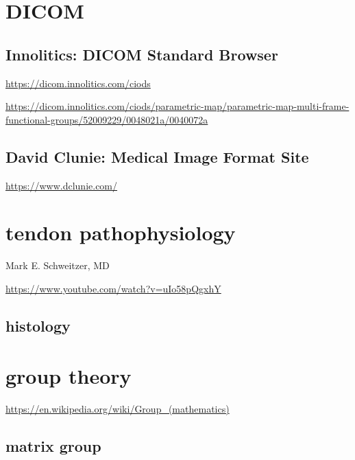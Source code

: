 \documentclass[
]{book}
\theoremstyle{definition}
\theoremstyle{definition}
\theoremstyle{definition}
\theoremstyle{definition}
\theoremstyle{remark}
\begin{document}
\hypertarget{dicom}{%
\chapter{DICOM}\label{dicom}}

\hypertarget{innolitics-dicom-standard-browser}{%
\section{Innolitics: DICOM Standard Browser}\label{innolitics-dicom-standard-browser}}

\url{https://dicom.innolitics.com/ciods}

\url{https://dicom.innolitics.com/ciods/parametric-map/parametric-map-multi-frame-functional-groups/52009229/0048021a/0040072a}

\hypertarget{david-clunie-medical-image-format-site}{%
\section{David Clunie: Medical Image Format Site}\label{david-clunie-medical-image-format-site}}

\url{https://www.dclunie.com/}

\hypertarget{tendon-pathophysiology}{%
\chapter{tendon pathophysiology}\label{tendon-pathophysiology}}

Mark E. Schweitzer, MD

\url{https://www.youtube.com/watch?v=uIo58pQgxhY}

\hypertarget{histology}{%
\section{histology}\label{histology}}

\hypertarget{group-theory}{%
\chapter{group theory}\label{group-theory}}

\url{https://en.wikipedia.org/wiki/Group_(mathematics)}

\hypertarget{matrix-group}{%
\section{matrix group}\label{matrix-group}}
\end{document}
